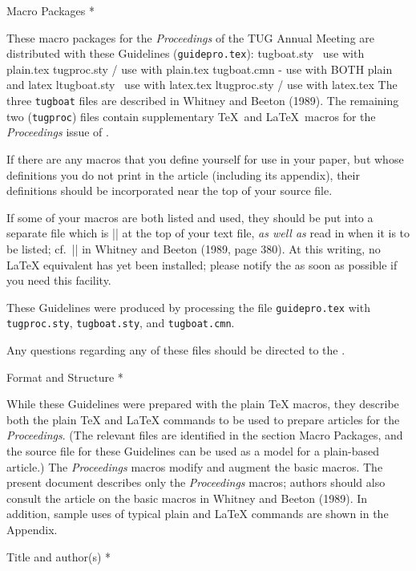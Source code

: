 \head * Macro Packages *

These macro packages for the {\sl Proceedings\/} of the TUG Annual
Meeting are distributed with these Guidelines ({\tt guidepro.tex}):
\verbatim
tugboat.sty   \ use with plain.tex
tugproc.sty   / use with plain.tex
tugboat.cmn   - use with BOTH
                plain and latex
ltugboat.sty  \ use with latex.tex
ltugproc.sty  / use with latex.tex
\endverbatim
The three {\tt *tugboat} files are described in Whitney and Beeton
(1989).  The remaining two ({\tt *tugproc}) files contain supplementary
\TeX\ and \LaTeX\ macros for the {\sl Proceedings\/} issue of \TUB.

If there are any macros that you define yourself for use in your paper,
but whose definitions you do not print in the article (including its
appendix), their definitions should be incorporated near the top of your
source file.

If some of your macros are both listed and used, they should be put into
a separate file which is || at the top of your text file, {\it as
well as\/} read in when it is to be listed; cf.\ |\verbfile| in Whitney
and Beeton (1989, page 380).  At this writing, no \LaTeX{} equivalent has
yet been installed; please notify the \editor{} as soon as possible if you
need this facility.

These Guidelines were produced by processing the file {\tt guidepro.tex}
with {\tt tugproc.sty}, {\tt tugboat.sty}, and {\tt tugboat.cmn}.

Any questions regarding any of these files should be directed to the
\editor.

\head * Format and Structure *

While these Guidelines were prepared with the plain \TeX{} macros,
they describe both the plain \TeX{} and \LaTeX{} commands to be used
to prepare articles for the {\sl Proceedings}.  (The relevant files
are identified in the section Macro Packages, and the source file for
these Guidelines can be used as a model for a plain-based article.)
The {\sl Proceedings\/} macros modify and augment the basic \TUB\/
macros.  The present document describes only the {\sl Proceedings\/}
macros; authors should also consult the article on the basic \TUB{}
macros in Whitney and Beeton (1989).  In addition, sample uses of
typical plain and \LaTeX{} commands are shown in the Appendix.

\subhead * Title and author(s) *

